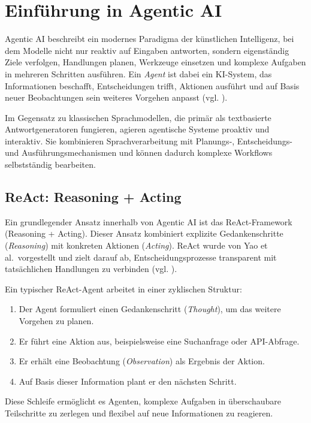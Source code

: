 \chapter{Einführung in Agentic AI}

Agentic AI beschreibt ein modernes Paradigma der künstlichen Intelligenz, bei dem Modelle nicht nur reaktiv auf Eingaben antworten, sondern eigenständig Ziele verfolgen, Handlungen planen, Werkzeuge einsetzen und komplexe Aufgaben in mehreren Schritten ausführen. Ein \textit{Agent} ist dabei ein KI-System, das Informationen beschafft, Entscheidungen trifft, Aktionen ausführt und auf Basis neuer Beobachtungen sein weiteres Vorgehen anpasst (vgl. \cite{yao2022react}).

Im Gegensatz zu klassischen Sprachmodellen, die primär als textbasierte Antwortgeneratoren fungieren, agieren agentische Systeme proaktiv und interaktiv. Sie kombinieren Sprachverarbeitung mit Planungs-, Entscheidungs- und Ausführungsmechanismen und können dadurch komplexe Workflows selbstständig bearbeiten.

\section{ReAct: Reasoning + Acting}

Ein grundlegender Ansatz innerhalb von Agentic AI ist das ReAct-Framework (Reasoning + Acting). Dieser Ansatz kombiniert explizite Gedankenschritte (\textit{Reasoning}) mit konkreten Aktionen (\textit{Acting}). ReAct wurde von Yao et al.\ vorgestellt und zielt darauf ab, Entscheidungsprozesse transparent mit tatsächlichen Handlungen zu verbinden (vgl. \cite{yao2022react}).

Ein typischer ReAct-Agent arbeitet in einer zyklischen Struktur:

\begin{enumerate}
    \item Der Agent formuliert einen Gedankenschritt (\textit{Thought}), um das weitere Vorgehen zu planen.
    \item Er führt eine Aktion aus, beispielsweise eine Suchanfrage oder API-Abfrage.
    \item Er erhält eine Beobachtung (\textit{Observation}) als Ergebnis der Aktion.
    \item Auf Basis dieser Information plant er den nächsten Schritt.
\end{enumerate}

Diese Schleife ermöglicht es Agenten, komplexe Aufgaben in überschaubare Teilschritte zu zerlegen und flexibel auf neue Informationen zu reagieren.


